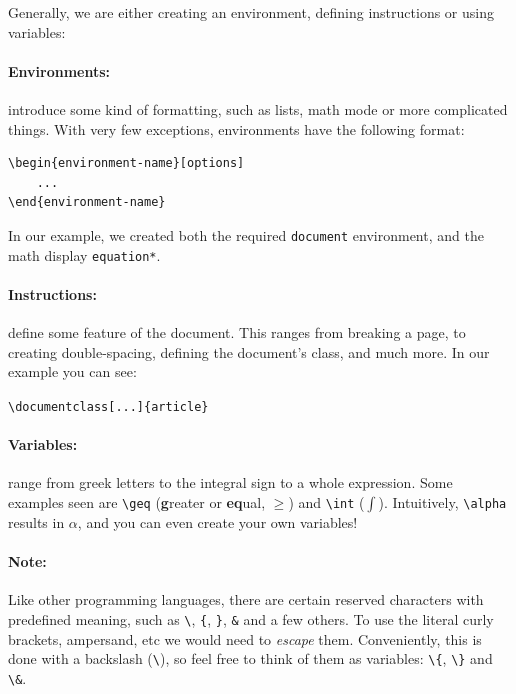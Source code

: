     Generally, we are either creating an environment, defining instructions or using variables:

    \paragraph{Environments:}
    introduce some kind of formatting, such as lists, math mode or more complicated things.
    With very few exceptions, environments have the following format:
        
    \begin{lstlisting}
\begin{environment-name}[options]
    ...
\end{environment-name}
    \end{lstlisting}
        
    In our example, we created both the required \texttt{document} environment, and the math display \texttt{equation*}.
        
    \paragraph{Instructions:}
    define some feature of the document. This ranges from breaking a page, to creating double-spacing, defining the document's class, and much more. In our example you can see:

    \verb|\documentclass[...]{article}|
        
    \paragraph{Variables:}
    range from greek letters to the integral sign to a whole expression.
    Some examples seen are \verb|\geq| (\textbf{g}reater or \textbf{eq}ual, \( \geq \)) and \verb|\int| ($\int$).
    Intuitively, \verb|\alpha| results in $\alpha$, and you can even create your own variables!
        
    \paragraph{Note:}
    Like other programming languages, there are certain reserved characters with predefined meaning, such as \verb|\|, \verb|{|, \verb|}|, \verb|&| and a few others.
    To use the literal curly brackets, ampersand, etc we would need to \emph{escape} them.
    Conveniently, this is done with a backslash (\verb|\|), so feel free to think of them as variables: \verb|\{|, \verb|\}| and \verb|\&|.

